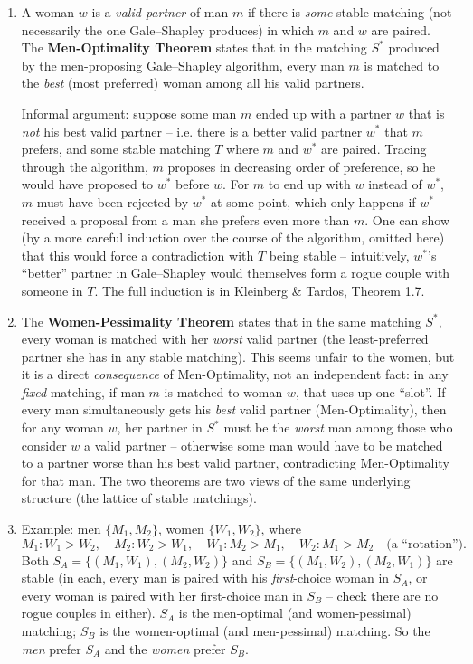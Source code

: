 \documentclass[11pt]{article}
\begin{document}
\begin{enumerate}[label=\textbf{A\arabic*.}, leftmargin=2.2em]
\item A woman $w$ is a \emph{valid partner} of man $m$ if there is \emph{some} stable
matching (not necessarily the one Gale--Shapley produces) in which $m$ and $w$ are paired.
The \textbf{Men-Optimality Theorem} states that in the matching $S^*$ produced by the
men-proposing Gale--Shapley algorithm, every man $m$ is matched to the \emph{best} (most
preferred) woman among all his valid partners.

Informal argument: suppose some man $m$ ended up with a partner $w$ that is \emph{not}
his best valid partner -- i.e. there is a better valid partner $w^*$ that $m$ prefers, and
some stable matching $T$ where $m$ and $w^*$ are paired. Tracing through the algorithm,
$m$ proposes in decreasing order of preference, so he would have proposed to $w^*$ before
$w$. For $m$ to end up with $w$ instead of $w^*$, $m$ must have been rejected by $w^*$ at
some point, which only happens if $w^*$ received a proposal from a man she prefers even
more than $m$. One can show (by a more careful induction over the course of the
algorithm, omitted here) that this would force a contradiction with $T$ being stable --
intuitively, $w^*$'s ``better'' partner in Gale--Shapley would themselves form a rogue
couple with someone in $T$. The full induction is in Kleinberg \& Tardos, Theorem 1.7.

\item The \textbf{Women-Pessimality Theorem} states that in the same matching $S^*$,
every woman is matched with her \emph{worst} valid partner (the least-preferred partner
she has in any stable matching). This seems unfair to the women, but it is a direct
\emph{consequence} of Men-Optimality, not an independent fact: in any \emph{fixed}
matching, if man $m$ is matched to woman $w$, that uses up one ``slot''. If every man
simultaneously gets his \emph{best} valid partner (Men-Optimality), then for any woman
$w$, her partner in $S^*$ must be the \emph{worst} man among those who consider $w$ a
valid partner -- otherwise some man would have to be matched to a partner worse than his
best valid partner, contradicting Men-Optimality for that man. The two theorems are two
views of the same underlying structure (the lattice of stable matchings).

\item Example: men $\{M_1, M_2\}$, women $\{W_1, W_2\}$, where
\[
  M_1: W_1 > W_2, \quad M_2: W_2 > W_1, \quad W_1: M_2 > M_1, \quad W_2: M_1 > M_2
  \quad \text{(a ``rotation'')}.
\]
Both $S_A = \{(M_1,W_1), (M_2,W_2)\}$ and $S_B = \{(M_1,W_2), (M_2,W_1)\}$ are stable (in
each, every man is paired with his \emph{first}-choice woman in $S_A$, or every woman is
paired with her first-choice man in $S_B$ -- check there are no rogue couples in either).
$S_A$ is the men-optimal (and women-pessimal) matching; $S_B$ is the women-optimal (and
men-pessimal) matching. So the \emph{men} prefer $S_A$ and the \emph{women} prefer $S_B$.


\end{enumerate}
\end{document}

